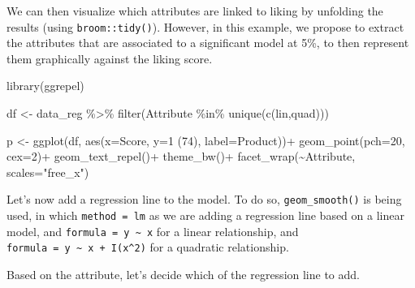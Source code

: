 \documentclass[
]{book}
\newenvironment{Shaded}{\begin{snugshade}}{\end{snugshade}}
\newcommand{\AttributeTok}[1]{\textcolor[rgb]{0.77,0.63,0.00}{#1}}
\newcommand{\ControlFlowTok}[1]{\textcolor[rgb]{0.13,0.29,0.53}{\textbf{#1}}}
\newcommand{\DecValTok}[1]{\textcolor[rgb]{0.00,0.00,0.81}{#1}}
\newcommand{\FunctionTok}[1]{\textcolor[rgb]{0.00,0.00,0.00}{#1}}
\newcommand{\NormalTok}[1]{#1}
\newcommand{\OtherTok}[1]{\textcolor[rgb]{0.56,0.35,0.01}{#1}}
\newcommand{\SpecialCharTok}[1]{\textcolor[rgb]{0.00,0.00,0.00}{#1}}
\newcommand{\StringTok}[1]{\textcolor[rgb]{0.31,0.60,0.02}{#1}}
\begin{document}
We can then visualize which attributes are linked to liking by unfolding the results (using \texttt{broom::tidy()}). However, in this example, we propose to extract the attributes that are associated to a significant model at 5\%, to then represent them graphically against the liking score.

\begin{Shaded}
\begin{Highlighting}[]
\FunctionTok{library}\NormalTok{(ggrepel)}

\NormalTok{df }\OtherTok{\textless{}{-}}\NormalTok{ data\_reg }\SpecialCharTok{\%\textgreater{}\%} 
  \FunctionTok{filter}\NormalTok{(Attribute }\SpecialCharTok{\%in\%} \FunctionTok{unique}\NormalTok{(}\FunctionTok{c}\NormalTok{(lin,quad)))}

\NormalTok{p }\OtherTok{\textless{}{-}} \FunctionTok{ggplot}\NormalTok{(df, }\FunctionTok{aes}\NormalTok{(}\AttributeTok{x=}\NormalTok{Score, }\AttributeTok{y=}\StringTok{\textasciigrave{}}\AttributeTok{1 (74)}\StringTok{\textasciigrave{}}\NormalTok{, }\AttributeTok{label=}\NormalTok{Product))}\SpecialCharTok{+}
  \FunctionTok{geom\_point}\NormalTok{(}\AttributeTok{pch=}\DecValTok{20}\NormalTok{, }\AttributeTok{cex=}\DecValTok{2}\NormalTok{)}\SpecialCharTok{+}
  \FunctionTok{geom\_text\_repel}\NormalTok{()}\SpecialCharTok{+}
  \FunctionTok{theme\_bw}\NormalTok{()}\SpecialCharTok{+}
  \FunctionTok{facet\_wrap}\NormalTok{(}\SpecialCharTok{\textasciitilde{}}\NormalTok{Attribute, }\AttributeTok{scales=}\StringTok{"free\_x"}\NormalTok{)}
\end{Highlighting}
\end{Shaded}

Let's now add a regression line to the model. To do so, \texttt{geom\_smooth()} is being used, in which \texttt{method\ =\ lm} as we are adding a regression line based on a linear model, and \texttt{formula\ =\ \textquotesingle{}y\ \textasciitilde{}\ x\textquotesingle{}} for a linear relationship, and \texttt{formula\ =\ \textquotesingle{}y\ \textasciitilde{}\ x\ +\ I(x\^{}2)\textquotesingle{}} for a quadratic relationship.

Based on the attribute, let's decide which of the regression line to add.

\begin{Shaded}
\end{Shaded}
\end{document}
